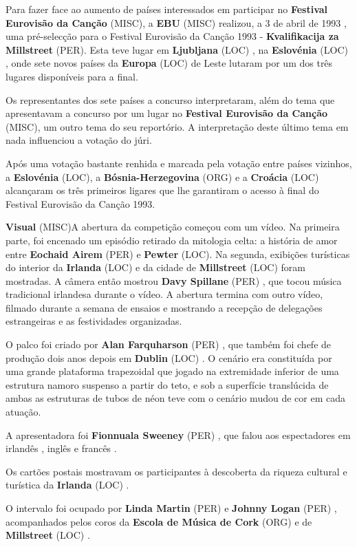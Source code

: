 \documentclass[12pt,a4paper]{article}
\begin{document}
Para fazer face ao aumento de países interessados em participar no \textbf{Festival Eurovisão da Canção} (MISC), a \textbf{EBU} (MISC) realizou, a 3 de abril de 1993 , uma pré-selecção para o Festival Eurovisão da Canção 1993 - \textbf{Kvalifikacija za Millstreet} (PER). Esta teve lugar em \textbf{Ljubljana} (LOC) , na \textbf{Eslovénia} (LOC) , onde sete novos países da \textbf{Europa} (LOC) de Leste lutaram por um dos três lugares disponíveis para a final.

Os representantes dos sete países a concurso interpretaram, além do tema que apresentavam a concurso por um lugar no \textbf{Festival Eurovisão da Canção} (MISC), um outro tema do seu reportório. A interpretação deste último tema em nada influenciou a votação do júri.

Após uma votação bastante renhida e marcada pela votação entre países vizinhos, a \textbf{Eslovénia} (LOC), a \textbf{Bósnia-Herzegovina} (ORG) e a \textbf{Croácia} (LOC) alcançaram os três primeiros ligares que lhe garantiram o acesso à final do Festival Eurovisão da Canção 1993.



\textbf{Visual} (MISC)A abertura da competição começou com um vídeo. Na primeira parte, foi encenado um episódio retirado da mitologia celta: a história de amor entre \textbf{Eochaid Airem} (PER) e \textbf{Pewter} (LOC). Na segunda, exibições turísticas do interior da \textbf{Irlanda} (LOC) e da cidade de \textbf{Millstreet} (LOC) foram mostradas. A câmera então mostrou \textbf{Davy Spillane} (PER) , que tocou música tradicional irlandesa durante o vídeo. A abertura termina com outro vídeo, filmado durante a semana de ensaios e mostrando a recepção de delegações estrangeiras e as festividades organizadas.

O palco foi criado por \textbf{Alan Farquharson} (PER) , que também foi chefe de produção dois anos depois em \textbf{Dublin} (LOC) . O cenário era constituída por uma grande plataforma trapezoidal que jogado na extremidade inferior de uma estrutura namoro suspenso a partir do teto, e sob a superfície translúcida de ambas as estruturas de tubos de néon teve com o cenário mudou de cor em cada atuação.

A apresentadora foi \textbf{Fionnuala Sweeney} (PER) , que falou aos espectadores em irlandês , inglês e francês .

Os cartões postais mostravam os participantes à descoberta da riqueza cultural e turística da \textbf{Irlanda} (LOC) .

O intervalo foi ocupado por \textbf{Linda Martin} (PER) e \textbf{Johnny Logan} (PER) , acompanhados pelos coros da \textbf{Escola de Música de Cork} (ORG) e de \textbf{Millstreet} (LOC) .
\end{document}
